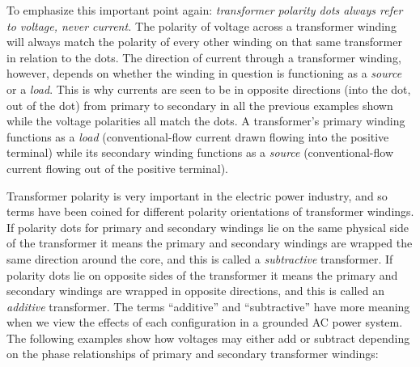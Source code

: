 To emphasize this important point again: \textit{transformer polarity dots always refer to voltage, never current.}  The polarity of voltage across a transformer winding will always match the polarity of every other winding on that same transformer in relation to the dots.  The direction of current through a transformer winding, however, depends on whether the winding in question is functioning as a \textit{source} or a \textit{load}.  This is why currents are seen to be in opposite directions (into the dot, out of the dot) from primary to secondary in all the previous examples shown while the voltage polarities all match the dots.  A transformer's primary winding functions as a \textit{load} (conventional-flow current drawn flowing into the positive terminal) while its secondary winding functions as a \textit{source} (conventional-flow current flowing out of the positive terminal).

\filbreak

Transformer polarity is very important in the electric power industry, and so terms have been coined for different polarity orientations of transformer windings.  If polarity dots for primary and secondary windings lie on the same physical side of the transformer it means the primary and secondary windings are wrapped the same direction around the core, and this is called a \textit{subtractive} transformer.  If polarity dots lie on opposite sides of the transformer it means the primary and secondary windings are wrapped in opposite directions, and this is called an \textit{additive} transformer.  The terms ``additive'' and ``subtractive'' have more meaning when we view the effects of each configuration in a grounded AC power system.  The following examples show how voltages may either add or subtract depending on the phase relationships of primary and secondary transformer windings:        

